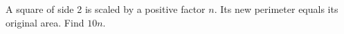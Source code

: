 A square of side 2 is scaled by a positive factor $n$. Its new perimeter equals its original area. Find $10n$.
